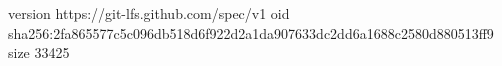 version https://git-lfs.github.com/spec/v1
oid sha256:2fa865577c5c096db518d6f922d2a1da907633dc2dd6a1688c2580d880513ff9
size 33425
